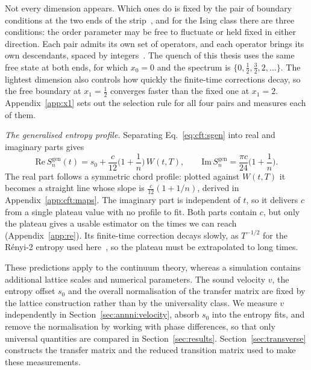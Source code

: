 Not every dimension appears. Which ones do is fixed by the pair of boundary conditions at the two ends of the strip~\cite{cardy1986bc}, and for the Ising class there are three conditions: the order parameter may be free to fluctuate or held fixed in either direction. Each pair admits its own set of operators, and each operator brings its own descendants, spaced by integers~\cite{cardy1989,cardy2004bcft}. The quench of this thesis uses the same free state at both ends, for which $x_0=0$ and the spectrum is $\{0,\tfrac12,\tfrac32,2,\dots\}$. The lightest dimension also controls how quickly the finite-time corrections decay, so the free boundary at $x_1=\tfrac12$ converges faster than the fixed one at $x_1=2$. Appendix~\ref{app:x1} sets out the selection rule for all four pairs and measures each of them.

\textit{The generalised entropy profile.} Separating Eq.~\eqref{eq:cft:sgen} into real and imaginary parts gives
\begin{equation}
  \mathrm{Re}\,S_n^{\mathrm{gen}}(t) = s_0 + \frac{c}{12}\Big(1+\frac{1}{n}\Big)\,W(t,T),
  \qquad
  \mathrm{Im}\,S_n^{\mathrm{gen}} = \frac{\pi c}{24}\Big(1+\frac{1}{n}\Big).
  \label{eq:cft:chord}
\end{equation}
The real part follows a symmetric chord profile: plotted against $W(t,T)$ it becomes a straight line whose slope is $\tfrac{c}{12}(1+1/n)$, derived in Appendix~\ref{app:cft:maps}. The imaginary part is independent of $t$, so it delivers $c$ from a single plateau value with no profile to fit. Both parts contain $c$, but only the plateau gives a usable estimator on the times we can reach (Appendix~\ref{app:re}). Its finite-time correction decays slowly, as $T^{-1/2}$ for the R\'enyi-2 entropy used here~\cite{boucomas2026}, so the plateau must be extrapolated to long times.

These predictions apply to the continuum theory, whereas a simulation contains additional lattice scales and numerical parameters. The sound velocity $v$, the entropy offset $s_0$ and the overall normalisation of the transfer matrix are fixed by the lattice construction rather than by the universality class. We measure $v$ independently in Section~\ref{sec:annni:velocity}, absorb $s_0$ into the entropy fits, and remove the normalisation by working with phase differences, so that only universal quantities are compared in Section~\ref{sec:results}. Section~\ref{sec:transverse} constructs the transfer matrix and the reduced transition matrix used to make these measurements.
